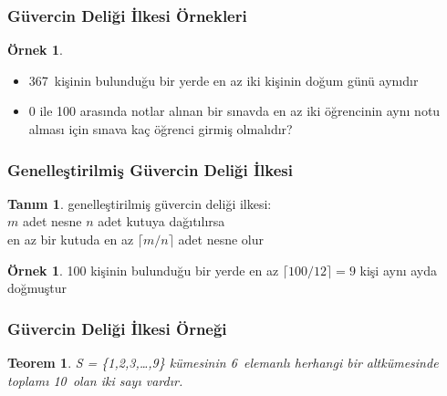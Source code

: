 \documentclass[dvipsnames]{beamer}
\theoremstyle{definition}
\newtheorem{tanim}[theorem]{Tanım}
\theoremstyle{example}
\newtheorem{ornek}[theorem]{Örnek}
\theoremstyle{plain}
\newtheorem{teorem}[theorem]{Teorem}
\begin{document}
\begin{frame}
  \frametitle{Güvercin Deliği İlkesi Örnekleri}

  \begin{ornek}
    \begin{itemize}
      \item 367~kişinin bulunduğu bir yerde en az iki kişinin doğum günü aynıdır

      \pause
      \item 0 ile 100 arasında notlar alınan bir sınavda en az iki öğrencinin
        aynı notu alması için sınava kaç öğrenci girmiş olmalıdır?
    \end{itemize}
  \end{ornek}
\end{frame}

\begin{frame}
  \frametitle{Genelleştirilmiş Güvercin Deliği İlkesi}

  \begin{tanim}
    \alert{genelleştirilmiş güvercin deliği ilkesi}:\\
    $m$ adet nesne $n$ adet kutuya dağıtılırsa\\
    en az bir kutuda en az $\lceil m / n \rceil$ adet nesne olur
  \end{tanim}

  \pause
  \begin{ornek}
    100 kişinin bulunduğu bir yerde en az $\lceil 100 / 12 \rceil = 9$ kişi
    aynı ayda doğmuştur
  \end{ornek}
\end{frame}

\begin{frame}
  \frametitle{Güvercin Deliği İlkesi Örneği}

  \begin{teorem}
    S = \{1,2,3,\dots,9\} kümesinin 6~elemanlı herhangi bir altkümesinde
    toplamı 10~olan iki sayı vardır.
  \end{teorem}
\end{frame}
\end{document}
